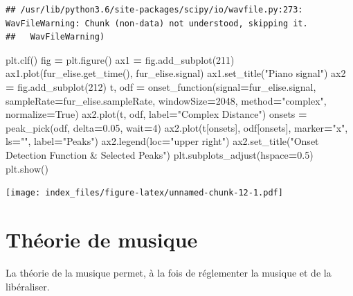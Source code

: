 \documentclass[]{article}
\newenvironment{Shaded}{\begin{snugshade}}{\end{snugshade}}
\newcommand{\DecValTok}[1]{\textcolor[rgb]{0.00,0.00,0.81}{#1}}
\newcommand{\FloatTok}[1]{\textcolor[rgb]{0.00,0.00,0.81}{#1}}
\newcommand{\NormalTok}[1]{#1}
\newcommand{\OperatorTok}[1]{\textcolor[rgb]{0.81,0.36,0.00}{\textbf{#1}}}
\newcommand{\StringTok}[1]{\textcolor[rgb]{0.31,0.60,0.02}{#1}}
\newcommand{\VariableTok}[1]{\textcolor[rgb]{0.00,0.00,0.00}{#1}}
\begin{document}
\begin{verbatim}
## /usr/lib/python3.6/site-packages/scipy/io/wavfile.py:273: WavFileWarning: Chunk (non-data) not understood, skipping it.
##   WavFileWarning)
\end{verbatim}

\begin{Shaded}
\begin{Highlighting}[]
\NormalTok{plt.clf()}
\NormalTok{fig }\OperatorTok{=}\NormalTok{ plt.figure()}
\NormalTok{ax1 }\OperatorTok{=}\NormalTok{ fig.add_subplot(}\DecValTok{211}\NormalTok{)}
\NormalTok{ax1.plot(fur_elise.get_time(), fur_elise.signal)}
\NormalTok{ax1.set_title(}\StringTok{"Piano signal"}\NormalTok{)}
\NormalTok{ax2 }\OperatorTok{=}\NormalTok{ fig.add_subplot(}\DecValTok{212}\NormalTok{)}
\NormalTok{t, odf }\OperatorTok{=}\NormalTok{ onset_function(signal}\OperatorTok{=}\NormalTok{fur_elise.signal, sampleRate}\OperatorTok{=}\NormalTok{fur_elise.sampleRate,}
\NormalTok{                                windowSize}\OperatorTok{=}\DecValTok{2048}\NormalTok{, method}\OperatorTok{=}\StringTok{"complex"}\NormalTok{, normalize}\OperatorTok{=}\VariableTok{True}\NormalTok{)}
\NormalTok{ax2.plot(t, odf, label}\OperatorTok{=}\StringTok{"Complex Distance"}\NormalTok{)}
\NormalTok{onsets }\OperatorTok{=}\NormalTok{ peak_pick(odf, delta}\OperatorTok{=}\FloatTok{0.05}\NormalTok{, wait}\OperatorTok{=}\DecValTok{4}\NormalTok{)}
\NormalTok{ax2.plot(t[onsets], odf[onsets], marker}\OperatorTok{=}\StringTok{"x"}\NormalTok{, ls}\OperatorTok{=}\StringTok{""}\NormalTok{, label}\OperatorTok{=}\StringTok{"Peaks"}\NormalTok{)}
\NormalTok{ax2.legend(loc}\OperatorTok{=}\StringTok{"upper right"}\NormalTok{)}
\NormalTok{ax2.set_title(}\StringTok{"Onset Detection Function & Selected Peaks"}\NormalTok{)}
\NormalTok{plt.subplots_adjust(hspace}\OperatorTok{=}\FloatTok{0.5}\NormalTok{)}
\NormalTok{plt.show()}
\end{Highlighting}
\end{Shaded}

\texttt{[image: index\_files/figure-latex/unnamed-chunk-12-1.pdf]}

\pagebreak

\hypertarget{theorie-de-musique}{%
\section{Théorie de musique}\label{theorie-de-musique}}

La théorie de la musique permet, à la fois de réglementer la musique et
de la libéraliser.
\end{document}
